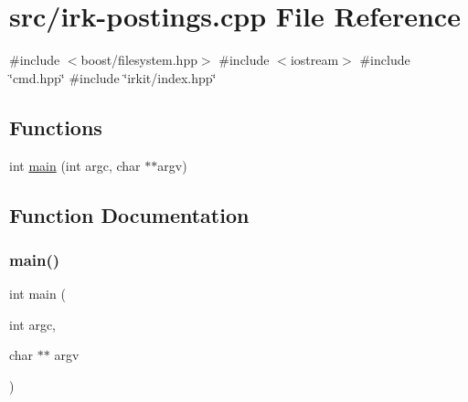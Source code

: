 \hypertarget{irk-postings_8cpp}{}\section{src/irk-\/postings.cpp File Reference}
\label{irk-postings_8cpp}
{\ttfamily \#include $<$boost/filesystem.\+hpp$>$}\newline
{\ttfamily \#include $<$iostream$>$}\newline
{\ttfamily \#include \char`\"{}cmd.\+hpp\char`\"{}}\newline
{\ttfamily \#include \char`\"{}irkit/index.\+hpp\char`\"{}}\newline
\subsection*{Functions}
\begin{DoxyCompactItemize}
\item 
int \mbox{\hyperlink{irk-postings_8cpp_a3c04138a5bfe5d72780bb7e82a18e627}{main}} (int argc, char $\ast$$\ast$argv)
\end{DoxyCompactItemize}


\subsection{Function Documentation}
\mbox{\label{irk-postings_8cpp_a3c04138a5bfe5d72780bb7e82a18e627}} 
\subsubsection{\texorpdfstring{main()}{main()}}
{\footnotesize\ttfamily int main (\begin{DoxyParamCaption}\item[{int}]{argc,  }\item[{char $\ast$$\ast$}]{argv }\end{DoxyParamCaption})}

